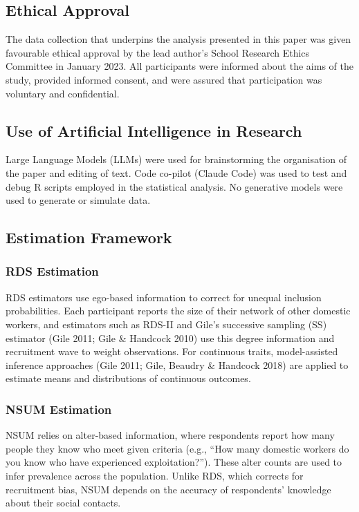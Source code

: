 \documentclass[
  12pt,
  letterpaper,
  DIV=11,
  numbers=noendperiod]{scrartcl}
\theoremstyle{plain}
\theoremstyle{definition}
\begin{document}
\subsection{Ethical Approval}\label{ethical-approval}

The data collection that underpins the analysis presented in this paper
was given favourable ethical approval by the lead author's School
Research Ethics Committee in January 2023. All participants were
informed about the aims of the study, provided informed consent, and
were assured that participation was voluntary and confidential.

\subsection{Use of Artificial Intelligence in
Research}\label{use-of-artificial-intelligence-in-research}

Large Language Models (LLMs) were used for brainstorming the
organisation of the paper and editing of text. Code co-pilot (Claude
Code) was used to test and debug R scripts employed in the statistical
analysis. No generative models were used to generate or simulate data.

\subsection{Estimation Framework}\label{estimation-framework}

\subsubsection{RDS Estimation}\label{rds-estimation}

RDS estimators use ego-based information to correct for unequal
inclusion probabilities. Each participant reports the size of their
network of other domestic workers, and estimators such as RDS-II and
Gile's successive sampling (SS) estimator (Gile 2011; Gile \& Handcock
2010) use this degree information and recruitment wave to weight
observations. For continuous traits, model-assisted inference approaches
(Gile 2011; Gile, Beaudry \& Handcock 2018) are applied to estimate
means and distributions of continuous outcomes.

\subsubsection{NSUM Estimation}\label{nsum-estimation}

NSUM relies on alter-based information, where respondents report how
many people they know who meet given criteria (e.g., ``How many domestic
workers do you know who have experienced exploitation?''). These alter
counts are used to infer prevalence across the population. Unlike RDS,
which corrects for recruitment bias, NSUM depends on the accuracy of
respondents' knowledge about their social contacts.
\end{document}
